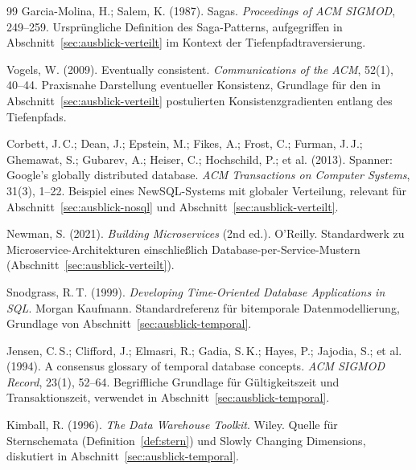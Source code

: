 ﻿\documentclass[a4paper,12pt]{report}
\theoremstyle{definition}
\theoremstyle{remark}
\begin{document}
\begin{thebibliography}{99}
Garcia-Molina, H.; Salem, K. (1987).
\newblock Sagas.
\newblock \emph{Proceedings of ACM SIGMOD}, 249--259.
\newblock Ursprüngliche Definition des Saga-Patterns, aufgegriffen in
Abschnitt~\ref{sec:ausblick-verteilt} im Kontext der
Tiefenpfadtraversierung.

Vogels, W. (2009).
\newblock Eventually consistent.
\newblock \emph{Communications of the ACM}, 52(1), 40--44.
\newblock Praxisnahe Darstellung eventueller Konsistenz, Grundlage
für den in Abschnitt~\ref{sec:ausblick-verteilt} postulierten
Konsistenzgradienten entlang des Tiefenpfads.

Corbett, J.\,C.; Dean, J.; Epstein, M.; Fikes, A.; Frost, C.;
Furman, J.\,J.; Ghemawat, S.; Gubarev, A.; Heiser, C.; Hochschild, P.;
et al. (2013).
\newblock Spanner: Google's globally distributed database.
\newblock \emph{ACM Transactions on Computer Systems}, 31(3), 1--22.
\newblock Beispiel eines NewSQL-Systems mit globaler Verteilung,
relevant für Abschnitt~\ref{sec:ausblick-nosql} und
Abschnitt~\ref{sec:ausblick-verteilt}.

Newman, S. (2021).
\newblock \emph{Building Microservices} (2nd ed.).
\newblock O'Reilly.
\newblock Standardwerk zu Microservice-Architekturen einschließlich
Database-per-Service-Mustern (Abschnitt~\ref{sec:ausblick-verteilt}).


Snodgrass, R.\,T. (1999).
\newblock \emph{Developing Time-Oriented Database Applications in SQL}.
\newblock Morgan Kaufmann.
\newblock Standardreferenz für bitemporale Datenmodellierung,
Grundlage von Abschnitt~\ref{sec:ausblick-temporal}.

Jensen, C.\,S.; Clifford, J.; Elmasri, R.; Gadia, S.\,K.; Hayes, P.;
Jajodia, S.; et al. (1994).
\newblock A consensus glossary of temporal database concepts.
\newblock \emph{ACM SIGMOD Record}, 23(1), 52--64.
\newblock Begriffliche Grundlage für Gültigkeitszeit und
Transaktionszeit, verwendet in Abschnitt~\ref{sec:ausblick-temporal}.

Kimball, R. (1996).
\newblock \emph{The Data Warehouse Toolkit}.
\newblock Wiley.
\newblock Quelle für Sternschemata (Definition~\ref{def:stern}) und
Slowly Changing Dimensions, diskutiert in
Abschnitt~\ref{sec:ausblick-temporal}.


\end{thebibliography}
\end{document}
